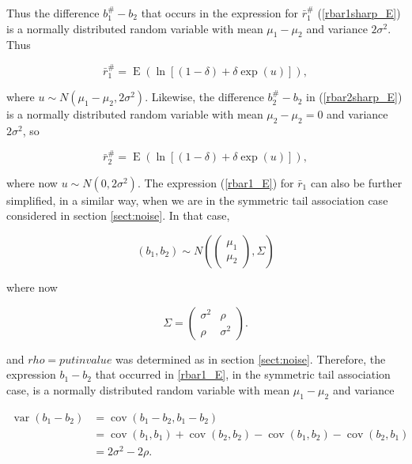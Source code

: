 \documentclass[letterpaper,11pt]{article}
\DeclareMathOperator{\EX}{E}%
\DeclareMathOperator{\VarX}{var}
\DeclareMathOperator{\CovX}{cov}
\begin{document}
\noindent Thus the difference $b_1^\#-b_2$ that occurs in the expression for $\bar r_1^\#$ (\ref{rbar1sharp_E}) is a normally distributed random variable with mean $\mu_1-\mu_2$ and variance $2\sigma^2$. Thus

\begin{equation}
\bar r_1^\#=\EX(\ln [(1-\delta)+\delta \exp(u)]),  \label{rbar1sharp_E_usub}
\end{equation}

\noindent where $u \sim N(\mu_1-\mu_2,2\sigma^2)$. Likewise, the difference $b_2^\#-b_2$ in (\ref{rbar2sharp_E}) is a normally distributed random variable with mean $\mu_2-\mu_2=0$ and variance $2\sigma^2$, so

\begin{equation}
\bar r_2^\#=\EX(\ln [(1-\delta)+\delta \exp(u)]),  \label{rbar2sharp_E_usub}
\end{equation}

\noindent where now $u \sim N(0,2\sigma^2)$. The expression (\ref{rbar1_E}) for $\bar r_1$ can also be further simplified, in a similar way, when we are in the symmetric tail association case considered in section \ref{sect:noise}. In that case,

\begin{equation}
(b_1,b_2) \sim  N(\begin{pmatrix} \mu_1\\\mu_2\end{pmatrix}, \Sigma) \label{b1b2_distribution_sym}
\end{equation}

\noindent where now

\begin{equation}
\Sigma = \begin{pmatrix} \sigma^2&\rho\\\rho&\sigma^2\end{pmatrix}. \label{Sigmamat_rho}
\end{equation}

\noindent and $rho=put in value$ was determined as in section \ref{sect:noise}. Therefore, the expression $b_1-b_2$ that occurred in \ref{rbar1_E}, in the symmetric tail association case, is a normally distributed random variable with mean $\mu_1-\mu_2$ and variance

\begin{align}
\VarX(b_1-b_2)&=\CovX(b_1-b_2, b_1-b_2) \\
                        &=\CovX(b_1,b_1)+\CovX(b_2,b_2)-\CovX(b_1,b_2)-\CovX(b_2,b_1) \\
                        &=2\sigma^2-2\rho.
\end{align}
\end{document}
